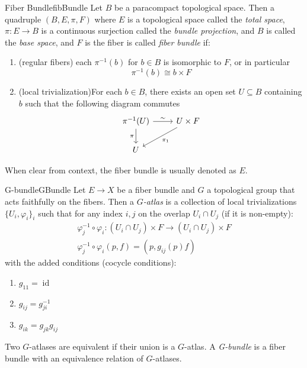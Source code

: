\documentclass{book}
\newcommand{\sse}{\subseteq}
\renewcommand{\phi}{\varphi}
\newcommand{\id}{{\operatorname{id}}}
\begin{document}
\begin{defn}{Fiber Bundle}{fibBundle}
	Let $B$ be a paracompact topological space. Then a quadruple $(B, E, \pi, F)$ where $E$ is
	a topological space called the \emph{total space}, $\pi: E \to B$ is a continuous surjection called the
	\emph{bundle projection}, and $B$ is called the \emph{base space}, and $F$ is the fiber is called
	\emph{fiber bundle} if:
	\begin{enumerate}
		\item (regular fibers) each $\pi^{-1}(b)$ for $b \in B$ is isomorphic to $F$, or in particular
			\[
				\pi^{-1}(b) \cong b\times F
			\]
		\item (local trivialization)For each $ b\in B$, there exists an open set $U \sse B$ containing $b$ such that the following
			diagram commutes
			\[
				\begin{tikzcd}
				\pi^{-1}(U) \arrow[r, "\sim"] \arrow[d, "\pi"'] & U\times F \arrow[ld, "\pi_1"] \\
				U                                               &
				\end{tikzcd}
			\]
	\end{enumerate}
	When clear from context, the fiber bundle is usually denoted as $E$.
\end{defn}

\begin{defn}{G-bundle}{GBundle}
  Let $E \to X$ be a fiber bundle and $G$ a topological group that acts faithfully on the fibers. Then
  a \emph{$G$-atlas} is a collection of local trivializations $\{U_i, \phi_i\}_i$ such that for any index
  $i,j$ on the overlap $U_i\cap U_j$ (if it is non-empty):
  \begin{gather*}
    \phi_j^{-1}\circ \phi_i: (U_i\cap U_j)\times F \to (U_i\cap U_j) \times F \\
    \phi_j^{-1}\circ\phi_i(p, f) = (p, g_{ij}(p)f)
  \end{gather*}
  with the added conditions (cocycle conditions):
  \begin{enumerate}
    \item $g_{11} = \id$
    \item $g_{ij} = g_{ji}^{-1}$
    \item $g_{ik} = g_{jk}g_{ij}$
  \end{enumerate}
  Two $G$-atlases are equivalent if their union is a $G$-atlas. A \emph{G-bundle} is a fiber bundle with an
  equivalence relation of $G$-atlases.
\end{defn}
\end{document}
